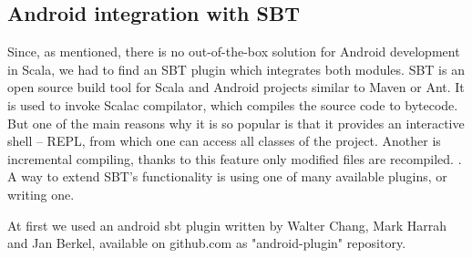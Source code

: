 \subsection{Android integration with SBT}
\label{subsec:choosing-ide}
Since, as mentioned, there is no out-of-the-box solution for Android development in Scala, we had to find an SBT plugin which integrates both modules. SBT is an open source build tool for Scala and Android projects similar to Maven or Ant. It is used to invoke Scalac compilator, which compiles the source code to bytecode. But one of the main reasons why it is so popular is that it provides an interactive shell -- REPL, from which one can access all classes of the project. Another is incremental compiling, thanks to this feature only modified files are recompiled. \cite{Fatin:2012:NewWay}. A way to extend SBT's functionality is using one of many available plugins, or writing one. 

At first we used an android sbt plugin written by Walter Chang, Mark Harrah and Jan Berkel, available on github.com as "android-plugin" repository. 





